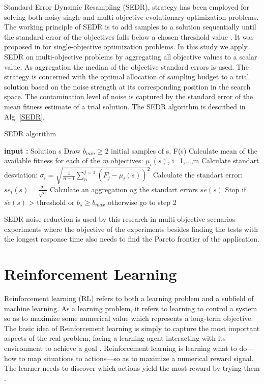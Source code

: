 \documentclass[espaco=umemeio,chapter=TITLE,twoside,openright]{abnt}
\begin{document}
Standard Error Dynamic Resampling (SEDR), strategy has been employed for solving both noisy single and multi-objective evolutionary
optimization problems. The working principle of SEDR is to add samples to a solution sequentially until the standard error of
the objectives falls below a chosen threshold value \cite{Siegmund2013}. It was proposed in \cite{DiPietro2004} for single-objective optimization problems. In this study we apply SEDR on multi-objective problems by aggregating all objective values to a scalar value. As aggregation the median of the objective standard errors is used. The strategy is concerned with the optimal allocation of sampling budget to a trial solution based on the noise strength at its corresponding position in the search space. The contamination level of noise is captured by the standard error of the mean fitness estimate of a trial solution. The SEDR algorithm is described in Alg. \ref{SEDR}.


\begin{algorithm}[h]
  \caption{SEDR algorithm \cite{Siegmund2013}}\label{SEDR}
  \begin{algorithmic}[1]

    \State \textbf{input :} Solution s
    \State Draw $b_{min}\ge 2$ initial samples of s, F(s)
    \State Calculate mean of the available fitness for each of the \textit{m} objectives: $\mu_{i}(s)$, i=1,...,m
    \State Calculate standart desviation: $\sigma_{i}=\sqrt{ \frac{1}{n-1} \sum_{n}^{j=1} (F^i_{j}-\mu_{i}(s))^2} $
    \State Calculate the standart error: $se_{i}(s)=\frac{\sigma_{i}}{\sqrt{n}}$
    \State Calculate an aggregation og the standart errors $\overline{se}(s)$
    \State Stop if  $\overline{se}(s)$ > threshold or $b_{s}\ge b_{max}$ otherwise go to step 2
  \end{algorithmic}
\end{algorithm}

SEDR noise reduction is used by this research in multi-objective scenarios experiments where the objective of the experiments besides finding the tests with the longest response time also needs to find the Pareto frontier of the application.


\section{Reinforcement Learning}

Reinforcement learning (RL) refers to both a learning problem and a subfield of machine learning. As a learning problem, it refers to learning to control a system so as to maximize some numerical value which represents a long-term objective. The basic idea of Reinforcement learning  is simply to capture the most important aspects of the real problem, facing a learning agent interacting with its environment to achieve a goal \cite{Sutton2012}. Reinforcement learning is learning what to do—how to map situations to actions—so as to maximize a numerical reward signal. The learner needs to discover which actions yield the most reward by trying them \cite{Sutton2012}.
\end{document}
